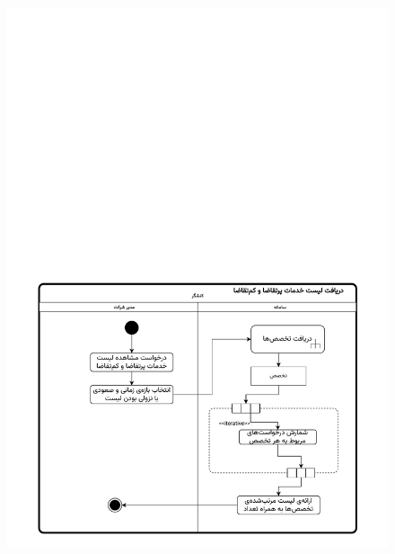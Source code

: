 \begin{figure}[ht!]
	\centering
	\includegraphics[scale=0.8, page=1]{figs/OOD-activity-popular.pdf}
\end{figure}
\FloatBarrier
\newpage


